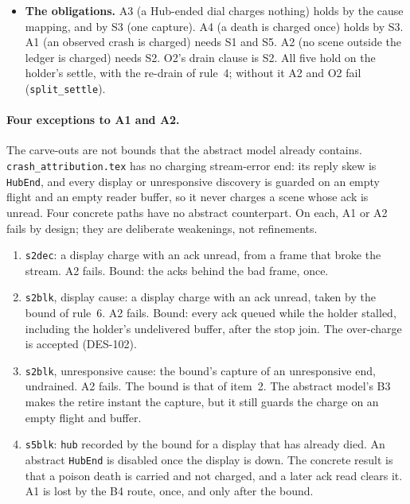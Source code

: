 \documentclass[a4paper,10pt,fleqn]{article}
\begin{document}
\begin{itemize}
    frame, so the poison scene is never among them.  The abstract model charges
    a scene that the concrete one does not only when a display recorded
    unresponsive later swaps and acknowledges that scene, and such a scene was
    not poison.
  \item \textbf{The obligations.}  A3 (a Hub-ended dial charges nothing) holds by
    the cause mapping, and by S3 (one capture).  A4 (a death is charged once)
    holds by S3.  A1 (an observed crash is charged) needs S1 and S5.  A2 (no
    scene outside the ledger is charged) needs S2.  O2's drain clause is S2.  All
    five hold on the holder's settle, with the re-drain of rule~4; without it A2
    and O2 fail (\texttt{split\_settle}).
\end{itemize}

\paragraph{Four exceptions to A1 and A2.}
The carve-outs are not bounds that the abstract model already contains.
\texttt{crash\_attribution.tex} has no charging stream-error end: its reply skew
is \texttt{HubEnd}, and every display or unresponsive discovery is guarded on an
empty flight and an empty reader buffer, so it never charges a scene whose ack
is unread.  Four concrete paths have no abstract counterpart.  On each, A1 or A2
fails by design; they are deliberate weakenings, not refinements.
\begin{enumerate}
  \item \texttt{s2dec}: a display charge with an ack unread, from a frame that
    broke the stream.  A2 fails.  Bound: the acks behind the bad frame, once.
  \item \texttt{s2blk}, display cause: a display charge with an ack unread,
    taken by the bound of rule~6.  A2 fails.  Bound: every ack queued while the
    holder stalled, including the holder's undelivered buffer, after the stop
    join.  The over-charge is accepted (DES-102).
  \item \texttt{s2blk}, unresponsive cause: the bound's capture of an
    unresponsive end, undrained.  A2 fails.  The bound is that of item~2.  The
    abstract model's B3 makes the retire instant the capture, but it still
    guards the charge on an empty flight and buffer.
  \item \texttt{s5blk}: \texttt{hub} recorded by the bound for a display that has
    already died.  An abstract \texttt{HubEnd} is disabled once the display is
    down.  The concrete result is that a poison death is carried and not charged,
    and a later ack read clears it.  A1 is lost by the B4 route, once, and only
    after the bound.
\end{enumerate}
\end{document}
